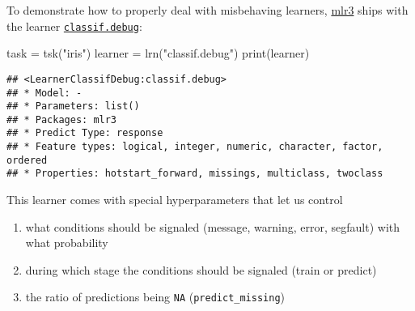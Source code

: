 \documentclass[
]{scrbook}
\newenvironment{Shaded}{\begin{snugshade}}{\end{snugshade}}
\newcommand{\FunctionTok}[1]{\textcolor[rgb]{0.00,0.00,0.00}{#1}}
\newcommand{\NormalTok}[1]{#1}
\newcommand{\OtherTok}[1]{\textcolor[rgb]{0.56,0.35,0.01}{#1}}
\newcommand{\SpecialCharTok}[1]{\textcolor[rgb]{0.00,0.00,0.00}{#1}}
\newcommand{\StringTok}[1]{\textcolor[rgb]{0.31,0.60,0.02}{#1}}
\providecommand{\tightlist}{%
  \setlength{\itemsep}{0pt}\setlength{\parskip}{0pt}}
\renewenvironment{Shaded} {\begin{snugshade}\small} {\end{snugshade}}
\begin{document}
To demonstrate how to properly deal with misbehaving learners, \href{https://mlr3.mlr-org.com}{mlr3} ships with the learner \href{https://mlr3.mlr-org.com/reference/mlr_learners_classif.debug.html}{\texttt{classif.debug}}:

\begin{Shaded}
\begin{Highlighting}[]
\NormalTok{task }\OtherTok{=} \FunctionTok{tsk}\NormalTok{(}\StringTok{"iris"}\NormalTok{)}
\NormalTok{learner }\OtherTok{=} \FunctionTok{lrn}\NormalTok{(}\StringTok{"classif.debug"}\NormalTok{)}
\FunctionTok{print}\NormalTok{(learner)}
\end{Highlighting}
\end{Shaded}

\begin{verbatim}
## <LearnerClassifDebug:classif.debug>
## * Model: -
## * Parameters: list()
## * Packages: mlr3
## * Predict Type: response
## * Feature types: logical, integer, numeric, character, factor, ordered
## * Properties: hotstart_forward, missings, multiclass, twoclass
\end{verbatim}

This learner comes with special hyperparameters that let us control

\begin{enumerate}
\def\labelenumi{\arabic{enumi}.}
\tightlist
\item
  what conditions should be signaled (message, warning, error, segfault) with what probability
\item
  during which stage the conditions should be signaled (train or predict)
\item
  the ratio of predictions being \texttt{NA} (\texttt{predict\_missing})
\end{enumerate}

\begin{Shaded}
\end{Shaded}
\end{document}
